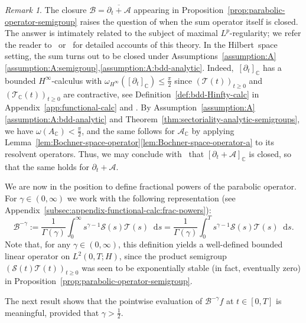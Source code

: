 \documentclass[reqno]{amsart}
\numberwithin{equation}{section}
\newcommand{\C}{\mathbb{C}}
\newcommand{\cA}{\mathcal{A}}
\newcommand{\cB}{\mathcal{B}}
\newcommand{\cS}{\mathcal{S}}
\newcommand{\cT}{\mathcal{T}}
\newcommand{\rd}{\mathop{}\!\mathrm{d}}
\newcommand{\clos}[1]{\overline{ #1 }}
\theoremstyle{remark}
\newtheorem{remark}[lemma]{Remark}
\theoremstyle{definition}
\begin{document}
\begin{remark}
	The closure $\cB =\clos{\partial_t + \cA}$ 
	appearing in Proposition~\ref{prop:parabolic-operator-semigroup} 
	raises the question of when the sum operator itself is closed. 
	The answer is intimately related 
	to the subject of maximal $L^p$-regularity;
	we refer the reader to~\cite{DRH2003} or~\cite{KunstmannWeis2004} for detailed accounts of this theory.
	In the Hilbert~space setting, 
	the sum turns out to be closed under 
	Assumptions~\ref{assumption:A}\ref{assumption:A:semigroup},\ref{assumption:A:bdd-analytic}. 
	Indeed,~$[\partial_t]_\C$ has a bounded $H^\infty$-calculus 
	with ${\omega_{H^\infty}([\partial_t]_\C) \leq \tfrac{\pi}{2}}$ 
	since $(\cT(t))_{t\geq 0}$ and $(\cT_\C(t))_{t\ge0}$ 
	are contractive, see 
	Definition~\ref{def:bdd-Hinfty-calc} 
	in Appendix~\ref{app:functional-calc} and 
	\cite[Theorem~10.2.24]{AnalysisInBanachSpacesII}. 
	By Assumption~\ref{assumption:A}\ref{assumption:A:bdd-analytic} 
	and Theorem~\ref{thm:sectoriality-analytic-semigroups},  
	we have $\omega(A_\C) < \tfrac{\pi}{2}$, 
	and the same follows for $\cA_\C$  
	by applying 
	Lemma~\ref{lem:Bochner-space-operator}\ref{lem:Bochner-space-operator-a} 
	to its resolvent operators. 
	Thus, we may conclude 
	with~\cite[Theorem~12.13]{KunstmannWeis2004} 
	that $[\partial_t + \cA]_\C$ is closed, so that 
	the same holds for $\partial_t + \cA$.
\end{remark}


We are now in the position to define fractional powers 
of the parabolic operator. 
For $\gamma \in(0,\infty)$ 
we work with the 
following representation 
(see Appendix~\ref{subsec:appendix-functional-calc:frac-powers}): 
%
\begin{equation}\label{eq:def-neg-fractional-parabolic} 
\cB^{-\gamma} 
:= 
\frac{1}{\Gamma(\gamma)} 
\int_0^\infty s^{\gamma-1} \cS(s) \cT(s) \rd s 
= 
\frac{1}{\Gamma(\gamma)} 
\int_0^T s^{\gamma-1} \cS(s) \cT(s) \rd s.
\end{equation}
% 
Note that, for any $\gamma\in(0,\infty)$, 
this definition yields a well-defined bounded linear operator 
on $L^2(0,T;H)$, since the product semigroup 
$(\cS(t)\cT(t))_{t\geq 0}$ was seen to be exponentially 
stable (in fact, eventually zero) in 
Proposition~\ref{prop:parabolic-operator-semigroup}. 

The next result shows that the pointwise evaluation 
of $\cB^{-\gamma}f$ at $t\in[0,T]$ is meaningful,  
provided that $\gamma>\frac{1}{2}$. 
\end{document}

